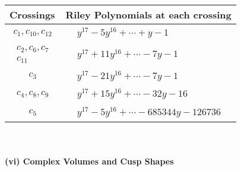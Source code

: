 \documentclass[1p]{elsarticle_modified}
\theoremstyle{definition}
\begin{document}
\begin{tabular}{m{50pt}|m{274pt}}
Crossings & \hspace{64pt}Riley Polynomials at each crossing \\
\hline $$\begin{aligned}c_{1},c_{10},c_{12}\end{aligned}$$&$\begin{aligned}
&y^{17}-5 y^{16}+\cdots+y-1
\end{aligned}$\\
\hline $$\begin{aligned}c_{2},c_{6},c_{7}\\c_{11}\end{aligned}$$&$\begin{aligned}
&y^{17}+11 y^{16}+\cdots-7 y-1
\end{aligned}$\\
\hline $$\begin{aligned}c_{3}\end{aligned}$$&$\begin{aligned}
&y^{17}-21 y^{16}+\cdots-7 y-1
\end{aligned}$\\
\hline $$\begin{aligned}c_{4},c_{8},c_{9}\end{aligned}$$&$\begin{aligned}
&y^{17}+15 y^{16}+\cdots-32 y-16
\end{aligned}$\\
\hline $$\begin{aligned}c_{5}\end{aligned}$$&$\begin{aligned}
&y^{17}-5 y^{16}+\cdots-685344 y-126736
\end{aligned}$\\
\hline
\end{tabular}\\~\\
\newpage\flushleft \textbf{(vi) Complex Volumes and Cusp Shapes}
\end{document}
